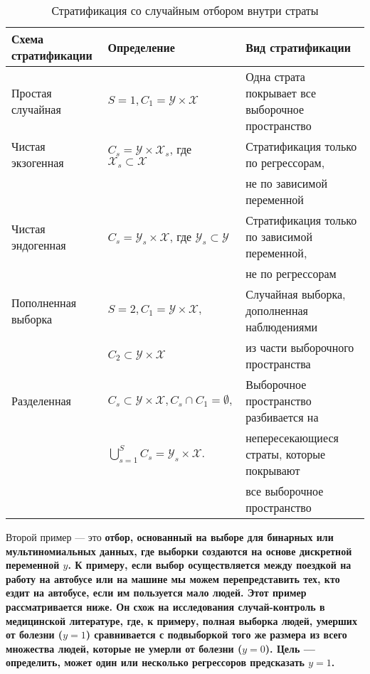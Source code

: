 \begin{table}[h]
\caption{\label{tab:pred} Стратификация со случайным отбором внутри страты}
\begin{center}
\begin{tabular}{lll}
\hline
\hline
 Схема стратификации & Определение & Вид стратификации \\
\hline
Простая случайная & $S = 1, C_1 = \mathcal Y \times \mathcal X$ & Одна страта покрывает все выборочное пространство \\
Чистая экзогенная & $C_s = \mathcal Y \times \mathcal X_s$, где $\mathcal X_s \subset \mathcal X$ &  Стратификация только по регрессорам, \\
& & не по зависимой переменной \\
Чистая эндогенная & $C_s = \mathcal Y_s \times \mathcal X$, где $\mathcal Y_s \subset \mathcal Y$ &  Стратификация только по зависимой переменной, \\
& & не по регрессорам \\
Пополненная выборка & $S = 2, C_1 = \mathcal Y \times \mathcal X,$ & Случайная выборка, дополненная наблюдениями \\
& $C_2 \subset \mathcal Y \times \mathcal X \nonumber$ & из части выборочного пространства \\
Разделенная & $C_s \subset \mathcal Y \times \mathcal X, C_s \cap C_1 = \emptyset,$ & Выборочное пространство разбивается на \\
& $\bigcup_{s=1}^S C_s =  \mathcal Y_s \times \mathcal X.$ & непересекающиеся страты, которые покрывают \\
& & все выборочное пространство \\
\hline
\hline
\end{tabular}
\end{center}
\end{table}

Второй пример --- это \bfseries отбор, основанный на выборе \mdseries для бинарных или мультиномиальных данных, где выборки создаются на основе дискретной переменной $y$. К примеру, если выбор осуществляется между поездкой на работу на автобусе или на машине мы можем перепредставить тех, кто ездит на автобусе, если им пользуется мало людей. Этот пример рассматривается ниже. Он схож на \bfseries исследования случай-контроль \mdseries в медицинской литературе, где, к примеру, полная выборка людей, умерших от болезни ($y=1$) сравнивается с подвыборкой того же размера из всего множества людей, которые не умерли от болезни ($y=0$). Цель --- определить, может один или несколько регрессоров предсказать $y=1$. 

